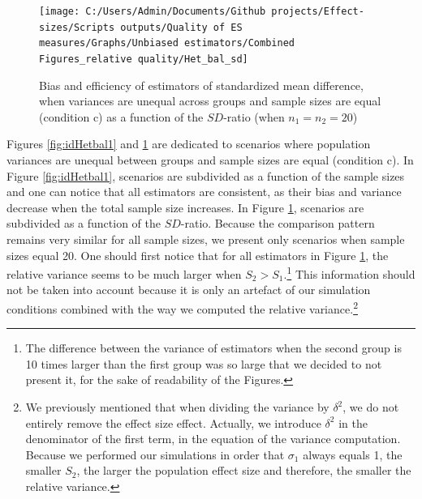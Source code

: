 \documentclass[
  english,
  man]{apa6}
\begin{document}
\begin{figure}

{\centering \texttt{[image: C:/Users/Admin/Documents/Github projects/Effect-sizes/Scripts outputs/Quality of ES measures/Graphs/Unbiased estimators/Combined Figures\_relative quality/Het\_bal\_sd]} 

}

\caption{Bias and efficiency of estimators of standardized mean difference, when variances are unequal across groups and sample sizes are equal (condition c) as a function of the $SD$-ratio (when $n_1=n_2=20$)}\label{fig:idHetbal2}
\end{figure}
\newpage

Figures \ref{fig:idHetbal1} and \ref{fig:idHetbal2} are dedicated to scenarios where population variances are unequal between groups and sample sizes are equal (condition c). In Figure \ref{fig:idHetbal1}, scenarios are subdivided as a function of the sample sizes and one can notice that all estimators are consistent, as their bias and variance decrease when the total sample size increases. In Figure \ref{fig:idHetbal2}, scenarios are subdivided as a function of the \(SD\)-ratio. Because the comparison pattern remains very similar for all sample sizes, we present only scenarios when sample sizes equal 20. One should first notice that for all estimators in Figure \ref{fig:idHetbal2}, the relative variance seems to be much larger when \(S_2>S_1\).\footnote{The difference between the variance of estimators when the second group is 10 times larger than the first group was so large that we decided to not present it, for the sake of readability of the Figures.} This information should not be taken into account because it is only an artefact of our simulation conditions combined with the way we computed the relative variance.\footnote{We previously mentioned that when dividing the variance by $\delta^2$, we do not entirely remove the effect size effect. Actually, we introduce $\delta^2$ in the denominator of the first term, in the equation of the variance computation. Because we performed our simulations in order that $\sigma_1$ always equals 1, the smaller $S_2$, the larger the population effect size and therefore, the smaller the relative variance.}
\end{document}
